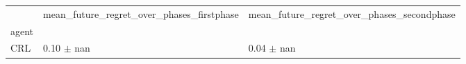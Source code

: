\begin{tabular}{lll}
\toprule
 & mean_future_regret_over_phases_firstphase & mean_future_regret_over_phases_secondphase \\
agent &  &  \\
\midrule
CRL & 0.10 $\pm$ nan & 0.04 $\pm$ nan \\
\bottomrule
\end{tabular}
